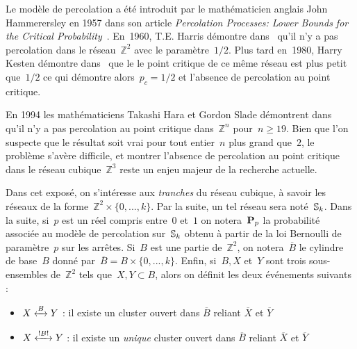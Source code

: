 \vspace*{0.3cm}
	Le modèle de percolation a été introduit par le mathématicien anglais John Hammerersley en 1957 dans son article \emph{Percolation Processes: Lower Bounds for the Critical Probability}~\cite{hammer}. En~1960, T.E. Harris démontre dans~\cite{harris} qu'il n'y a pas percolation dans le réseau~$\mathbb{Z}^2$ avec le paramètre~$1/2$. Plus tard en~1980, Harry Kesten démontre dans~\cite{kesten} que le le point critique de ce même réseau est plus petit que~$1/2$ ce qui démontre alors~$p_c=1/2$ et l'absence de percolation au point critique.
	
	En 1994 les mathématiciens Takashi Hara et Gordon Slade démontrent dans~\cite{mean} qu'il n'y a pas percolation au point critique dans~$\mathbb{Z}^n$ pour~$n\geq 19$. Bien que l'on suspecte que le résultat soit vrai pour tout entier~$n$ plus grand que~$2$, le problème s'avère difficile, et montrer l'absence de percolation au point critique dans le réseau cubique~$\mathbb{Z}^3$ reste un enjeu majeur de la recherche actuelle.
	
	Dans cet exposé, on s'intéresse aux \emph{tranches} du réseau cubique, à savoir les réseaux de la forme~$\mathbb{Z}^2\times\{0,...,k\}$. Par la suite, un tel réseau sera noté~$\Sk$. \marginnote{$\Sk$}
	Dans la suite, si~$p$ est un réel compris entre~$0$ et~$1$ on notera~$\PpSP$ \marginnote{$\PpSP$} la probabilité associée au modèle de percolation sur~$\Sk$ obtenu à partir de la loi Bernoulli de paramètre~$p$ sur les arrêtes. Si~$B$ est une partie de~$\mathbb{Z}^2$, on notera~$\overline{B}$  le cylindre de base~$B$ donné par~$\overline{B}=B\times\{0,...,k\}$. 	
	Enfin, si~$B, X$ et~$Y$ sont trois sous-ensembles de~$\mathbb{Z}^2$ tels que~$X,Y\subset B$, alors on définit les deux événements suivants :
	\begin{itemize}
		\item[] $\relie[B]{X}{Y}$  : \og{} il existe un cluster ouvert dans $\overline{B}$ reliant $\overline{X}$ et $\overline{Y}$  \fg{}
		\item[] $\relie*[B]{X}{Y}$  :  \og{} il existe un \emph{unique} cluster ouvert dans $\overline{B}$ reliant $\overline{X}$ et $\overline{Y}$  \fg{}
	\end{itemize}
	
